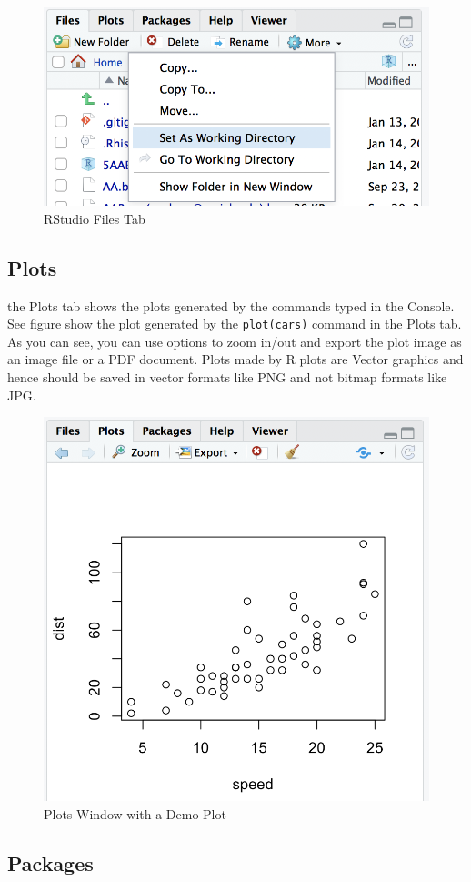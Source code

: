 \documentclass[]{krantz}
\theoremstyle{definition}
\theoremstyle{definition}
\theoremstyle{definition}
\theoremstyle{remark}
\begin{document}
\begin{figure}

{\centering \includegraphics[width=0.5\linewidth]{images/files} 

}

\caption{RStudio Files Tab}\label{fig:unnamed-chunk-6}
\end{figure}

\subsection{Plots}\label{plots}

the Plots tab shows the plots generated by the commands typed in the
Console. See figure show the plot generated by the \texttt{plot(cars)}
command in the Plots tab. As you can see, you can use options to zoom
in/out and export the plot image as an image file or a PDF document.
Plots made by R plots are Vector graphics and hence should be saved in
vector formats like PNG and not bitmap formats like JPG.

\begin{figure}

{\centering \includegraphics[width=0.5\linewidth]{images/plots} 

}

\caption{Plots Window with a Demo Plot}\label{fig:unnamed-chunk-7}
\end{figure}

\subsection{Packages}\label{packages}
\end{document}

